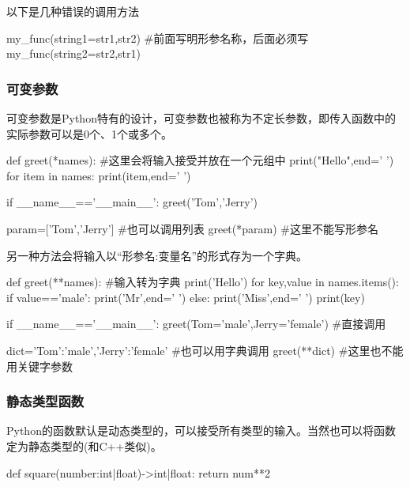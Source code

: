       以下是几种错误的调用方法
      \begin{codeblock}[language=python, caption={mistakes in using functions}]
        my_func(string1=str1,str2) #前面写明形参名称，后面必须写
        my_func(string2=str2,str1)
      \end{codeblock}

    \subsubsection{可变参数}
      可变参数是Python特有的设计，可变参数也被称为不定长参数，即传入函数中的实际参数可以是0个、1个或多个。
      \begin{codeblock}[language=python, caption={variable parameters}]
        def greet(*names): #这里会将输入接受并放在一个元组中
          print("Hello",end=' ')
          for item in names:
            print(item,end=' ')

        if __name__=='__main__':
          greet('Tom','Jerry')

          param=['Tom','Jerry'] #也可以调用列表
          greet(*param) #这里不能写形参名
      \end{codeblock}

      另一种方法会将输入以``形参名:变量名''的形式存为一个字典。
      \begin{codeblock}[language=python, caption={other variable parameters}]
        def greet(**names): #输入转为字典
          print('Hello')
          for key,value in names.items():
            if value=='male':
              print('Mr',end=' ')
            else:
              print('Miss',end=' ')
            print(key)

        if __name__=='__main__':
          greet(Tom='male',Jerry='female') #直接调用

          dict={'Tom':'male','Jerry':'female'} #也可以用字典调用
          greet(**dict) #这里也不能用关键字参数
      \end{codeblock}

    \subsubsection{静态类型函数}
      Python的函数默认是动态类型的，可以接受所有类型的输入。当然也可以将函数定为静态类型的(和C++类似)。
      \begin{codeblock}[language=python, caption={static functions}]
        def square(number:int|float)->int|float:
          return num**2
      \end{codeblock}

